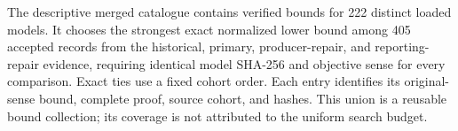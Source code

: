 The descriptive merged catalogue contains verified bounds for 222 distinct loaded models. It chooses the strongest exact normalized lower bound among 405 accepted records from the historical, primary, producer-repair, and reporting-repair evidence, requiring identical model SHA-256 and objective sense for every comparison. Exact ties use a fixed cohort order. Each entry identifies its original-sense bound, complete proof, source cohort, and hashes. This union is a reusable bound collection; its coverage is not attributed to the uniform search budget.
